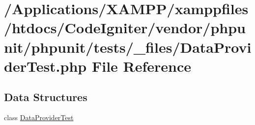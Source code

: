 \hypertarget{_data_provider_test_8php}{}\section{/\+Applications/\+X\+A\+M\+P\+P/xamppfiles/htdocs/\+Code\+Igniter/vendor/phpunit/phpunit/tests/\+\_\+files/\+Data\+Provider\+Test.php File Reference}
\label{_data_provider_test_8php}
\subsection*{Data Structures}
\begin{DoxyCompactItemize}
\item 
class \mbox{\hyperlink{class_data_provider_test}{Data\+Provider\+Test}}
\end{DoxyCompactItemize}
